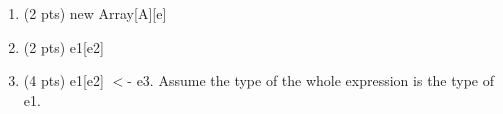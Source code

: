 \documentclass[10pt]{article}
\begin{document}
\begin{enumerate}
\begin{enumerate}
\begin{enumerate}
    \item (2 pts) \textsf{new Array[A][e]}
    \item (2 pts) \textsf{e1[e2]}
    \item (4 pts) \textsf{e1[e2] $<$- e3}. Assume the type of the whole expression is the type of \textsf{e1}.

\end{enumerate}
\end{enumerate}
\end{enumerate}
\end{document}
